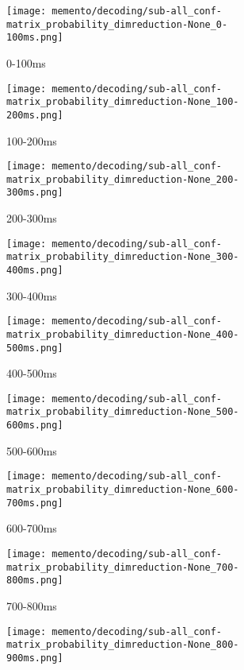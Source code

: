 \begin{figure}[H]
	\centering
	\begin{subfigure}{.19\textwidth}
		\texttt{[image: memento/decoding/sub-all\_conf-matrix\_probability\_dimreduction-None\_0-100ms.png]}
		\caption{0-100ms}
		\label{fig:conf0}
	\end{subfigure}
	\begin{subfigure}{0.19\textwidth}
		\texttt{[image: memento/decoding/sub-all\_conf-matrix\_probability\_dimreduction-None\_100-200ms.png]}
		\caption{100-200ms}
		\label{fig:conf1}
	\end{subfigure}
	\begin{subfigure}{.19\textwidth}
		\texttt{[image: memento/decoding/sub-all\_conf-matrix\_probability\_dimreduction-None\_200-300ms.png]}
		\caption{200-300ms}
		\label{fig:conf2}
	\end{subfigure}
	\begin{subfigure}{0.19\textwidth}
		\texttt{[image: memento/decoding/sub-all\_conf-matrix\_probability\_dimreduction-None\_300-400ms.png]}
		\caption{300-400ms}
		\label{fig:conf3}
	\end{subfigure}
	\begin{subfigure}{0.19\textwidth}
		\texttt{[image: memento/decoding/sub-all\_conf-matrix\_probability\_dimreduction-None\_400-500ms.png]}
		\caption{400-500ms}
		\label{fig:conf4}
	\end{subfigure}
	\begin{subfigure}{.19\textwidth}
		\texttt{[image: memento/decoding/sub-all\_conf-matrix\_probability\_dimreduction-None\_500-600ms.png]}
		\caption{500-600ms}
		\label{fig:conf5}
	\end{subfigure}
	\begin{subfigure}{0.19\textwidth}
		\texttt{[image: memento/decoding/sub-all\_conf-matrix\_probability\_dimreduction-None\_600-700ms.png]}
		\caption{600-700ms}
		\label{fig:conf6}
	\end{subfigure}
	\begin{subfigure}{.19\textwidth}
		\texttt{[image: memento/decoding/sub-all\_conf-matrix\_probability\_dimreduction-None\_700-800ms.png]}
		\caption{700-800ms}
		\label{fig:conf7}
	\end{subfigure}
	\begin{subfigure}{0.19\textwidth}
		\texttt{[image: memento/decoding/sub-all\_conf-matrix\_probability\_dimreduction-None\_800-900ms.png]}

\end{subfigure}
\end{figure}
